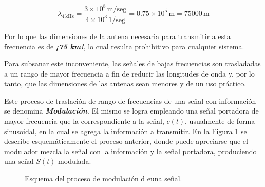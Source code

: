 \[ \displaystyle
  \lambda_{4\,\text{kHz}} = \frac{ 3\times 10^8 \,\text{m/seg} }{ 4 \times 10^3\,\text{1/seg}} = 0.75 \times 10 ^5 \,\text{m} = 75000 \,\text{m}
\]

Por lo que las dimensiones de la antena necesaria para transmitir a esta frecuencia es de \textbf{\it ¡75 km!}, lo cual resulta prohibitivo para cualquier sistema.

Para subsanar este inconveniente, las señales de bajas frecuencias son trasladadas a un rango de mayor frecuencia a fin de reducir las longitudes de onda y, por lo tanto,
que las dimensiones de las antenas sean menores y de un uso práctico.

Este proceso de traslación de rango de frecuencias de una señal con información se denomina \textbf{\it Modulación}.
El mismo se logra empleando una señal portadora de mayor frecuencia que la correspondiente a la señal, $c(t)$, usualmente de forma sinusoidal, en la cual se agrega la información
a transmitir.
En la Figura \ref{fig:A02.Modulacion.senial}
se describe esquemáticamente el proceso anterior, donde puede apreciarse que el modulador mezcla la señal con la información y la señal portadora, produciendo una señal $S(t)$ modulada.

\begin{figure}[!h]
  \centering
  \caption{Esquema del proceso de modulación d euna señal.}
  \label{fig:A02.Modulacion.senial}
\end{figure}




